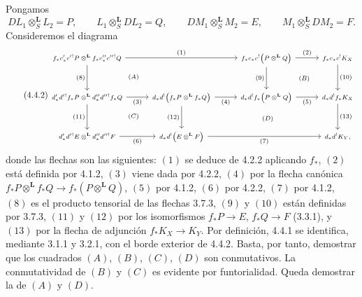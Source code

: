 \begin{prooftext}[Demostración]
Pongamos
\[
DL_1\otimes_S^{\mathbf L}L_2=P,\qquad
L_1\otimes_S^{\mathbf L}DL_2=Q,\qquad
DM_1\otimes_S^{\mathbf L}M_2=E,\qquad
M_1\otimes_S^{\mathbf L}DM_2=F.
\]
Consideremos el diagrama
\begin{equation}
\tag{4.4.2}
\begin{tikzcd}[column sep=2.6em,row sep=2.6em,cells={nodes={font=\scriptsize}}]
f_*c'_*c'{}^!P\otimes^{\mathbf L} f_*c''_*c''{}^!Q
  \arrow[rr,"(1)"] \arrow[d,"(8)"'] &&
f_*c_*c^!\bigl(P\otimes^{\mathbf L}Q\bigr)
  \arrow[r,"(2)"] \arrow[d,"(9)"'] &
f_*c_*c^!K_X \arrow[d,"(10)"]\\
d'_*d'{}^!f_*P\otimes^{\mathbf L}d''_*d''{}^!f_*Q
  \arrow[r,"(3)"'] \arrow[d,"(11)"'] &
d_*d^!\bigl(f_*P\otimes^{\mathbf L}f_*Q\bigr)
  \arrow[r,"(4)"'] \arrow[d,"(12)"'] &
d_*d^!f_*\bigl(P\otimes^{\mathbf L}Q\bigr)
  \arrow[r,"(5)"'] &
d_*d^!f_*K_X \arrow[d,"(13)"]\\
d'_*d'{}^!E\otimes^{\mathbf L}d''_*d''{}^!F
  \arrow[r,"(6)"'] &
d_*d^!\bigl(E\otimes^{\mathbf L}F\bigr)
  \arrow[rr,"(7)"'] &&
d_*d^!K_Y,
\arrow[from=1-1,to=2-2, phantom, "\scriptstyle (A)"]
\arrow[from=1-3,to=2-4, phantom, "\scriptstyle (B)"]
\arrow[from=2-1,to=3-2, phantom, "\scriptstyle (C)"]
\arrow[from=2-2,to=3-4, phantom, "\scriptstyle (D)"]
\end{tikzcd}
\end{equation}
donde las flechas son las siguientes: $(1)$ se deduce de 4.2.2 aplicando $f_*$, $(2)$ está definida por 4.1.2, $(3)$ viene dada por 4.2.2, $(4)$ por la flecha canónica $f_*P\otimes^{\mathbf L}f_*Q\longrightarrow f_*(P\otimes^{\mathbf L}Q)$, $(5)$ por 4.1.2, $(6)$ por 4.2.2, $(7)$ por 4.1.2, $(8)$ es el producto tensorial de las flechas 3.7.3, $(9)$ y $(10)$ están definidas por 3.7.3, $(11)$ y $(12)$ por los isomorfismos $f_*P\longrightarrow E$, $f_*Q\longrightarrow F$ (3.3.1), y $(13)$ por la flecha de adjunción $f_*K_X\longrightarrow K_Y$. Por definición, 4.4.1 se identifica, mediante 3.1.1 y 3.2.1, con el borde exterior de 4.4.2. Basta, por tanto, demostrar que los cuadrados $(A)$, $(B)$, $(C)$, $(D)$ son conmutativos. La conmutatividad de $(B)$ y $(C)$ es evidente por funtorialidad. Queda demostrar la de $(A)$ y $(D)$.


\end{prooftext}
